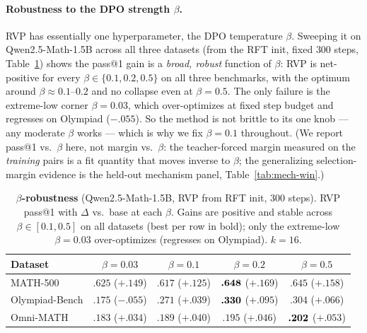 \paragraph{Robustness to the DPO strength $\beta$.}
RVP has essentially one hyperparameter, the DPO temperature $\beta$. Sweeping it on
Qwen2.5-Math-1.5B across all three datasets (from the RFT init, fixed $300$ steps,
Table~\ref{tab:beta}) shows the pass@1 gain is a \emph{broad, robust} function of $\beta$: RVP is
net-positive for every $\beta\in\{0.1,0.2,0.5\}$ on all three benchmarks, with the optimum around
$\beta\approx0.1$--$0.2$ and no collapse even at $\beta{=}0.5$. The only failure is the
extreme-low corner $\beta{=}0.03$, which over-optimizes at fixed step budget and regresses on
Olympiad ($-.055$). So the method is not brittle to its one knob --- any moderate $\beta$ works ---
which is why we fix $\beta{=}0.1$ throughout. (We report pass@1 vs.\ $\beta$ here, not margin vs.\
$\beta$: the teacher-forced margin measured on the \emph{training} pairs is a fit quantity that
moves inverse to $\beta$; the generalizing selection-margin evidence is the held-out mechanism
panel, Table~\ref{tab:mech-win}.)

\begin{table}[htbp]
\centering
\caption{\textbf{$\beta$-robustness} (Qwen2.5-Math-1.5B, RVP from RFT init, $300$ steps). RVP
pass@1 with $\Delta$ vs.\ base at each $\beta$. Gains are positive and stable across
$\beta\in[0.1,0.5]$ on all datasets (best per row in bold); only the extreme-low $\beta{=}0.03$
over-optimizes (regresses on Olympiad). $k{=}16$.}
\label{tab:beta}
\begin{tabular}{lcccc}
\toprule
Dataset & $\beta{=}0.03$ & $\beta{=}0.1$ & $\beta{=}0.2$ & $\beta{=}0.5$ \\
\midrule
MATH-500       & $.625$ ($+.149$) & $.617$ ($+.125$) & $\textbf{.648}$ ($\mathbf{+.169}$) & $.645$ ($+.158$) \\
Olympiad-Bench & $.175$ ($-.055$) & $.271$ ($+.039$) & $\textbf{.330}$ ($\mathbf{+.095}$) & $.304$ ($+.066$) \\
Omni-MATH      & $.183$ ($+.034$) & $.189$ ($+.040$) & $.195$ ($+.046$) & $\textbf{.202}$ ($\mathbf{+.053}$) \\
\bottomrule
\end{tabular}
\end{table}


